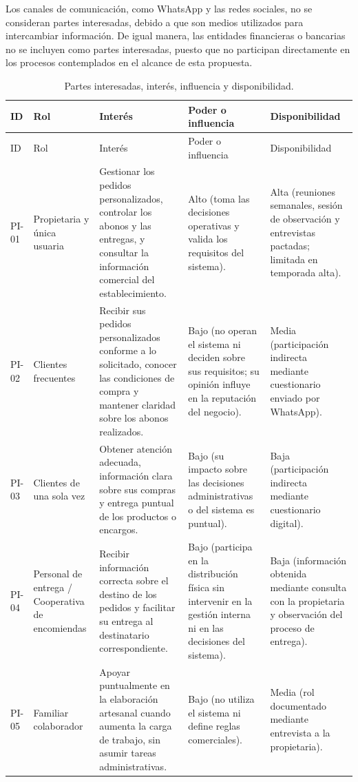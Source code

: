 \documentclass[11pt,a4paper]{article}
\begin{document}
	Los canales de comunicación, como WhatsApp y las redes sociales, no se consideran partes interesadas, debido a que son medios utilizados para intercambiar información. De igual manera, las entidades financieras o bancarias no se incluyen como partes interesadas, puesto que no participan directamente en los procesos contemplados en el alcance de esta propuesta.
	
	{\small
		\begin{xltabular}{\textwidth}{@{}lYYYY@{}}
			\caption{Partes interesadas, interés, influencia y disponibilidad.}\label{tab:interesados}\\
			\toprule
			ID & Rol & Interés & Poder o influencia & Disponibilidad \\
			\midrule
			\endfirsthead
			\toprule
			ID & Rol & Interés & Poder o influencia & Disponibilidad \\
			\midrule
			\endhead
			\bottomrule
			\endfoot
			
			PI-01 & Propietaria y única usuaria & Gestionar los pedidos personalizados, controlar los abonos y las entregas, y consultar la información comercial del establecimiento. & Alto (toma las decisiones operativas y valida los requisitos del sistema). & Alta (reuniones semanales, sesión de observación y entrevistas pactadas; limitada en temporada alta). \\
			
			PI-02 & Clientes frecuentes & Recibir sus pedidos personalizados conforme a lo solicitado, conocer las condiciones de compra y mantener claridad sobre los abonos realizados. & Bajo (no operan el sistema ni deciden sobre sus requisitos; su opinión influye en la reputación del negocio). & Media (participación indirecta mediante cuestionario enviado por WhatsApp). \\
			
			PI-03 & Clientes de una sola vez & Obtener atención adecuada, información clara sobre sus compras y entrega puntual de los productos o encargos. & Bajo (su impacto sobre las decisiones administrativas o del sistema es puntual). & Baja (participación indirecta mediante cuestionario digital). \\
			
			PI-04 & Personal de entrega / Cooperativa de encomiendas & Recibir información correcta sobre el destino de los pedidos y facilitar su entrega al destinatario correspondiente. & Bajo (participa en la distribución física sin intervenir en la gestión interna ni en las decisiones del sistema). & Baja (información obtenida mediante consulta con la propietaria y observación del proceso de entrega). \\
			
			PI-05 & Familiar colaborador & Apoyar puntualmente en la elaboración artesanal cuando aumenta la carga de trabajo, sin asumir tareas administrativas. & Bajo (no utiliza el sistema ni define reglas comerciales). & Media (rol documentado mediante entrevista a la propietaria). \\
			
		\end{xltabular}
	}
	
\end{document}
